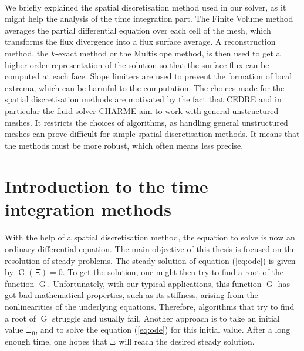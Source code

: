       \paragraph{}
      We briefly explained the spatial discretisation method used in our solver, as it might help the analysis of the time integration part.
      The Finite Volume method averages the partial differential equation over each cell of the mesh, which transforms the flux divergence into a flux surface average.
      A reconstruction method, the $k$-exact method or the Multislope method, is then used to get a higher-order representation of the solution so that the surface flux can be computed at each face.
      Slope limiters are used to prevent the formation of local extrema, which can be harmful to the computation.
      The choices made for the spatial discretisation methods are motivated by the fact that CEDRE and in particular the fluid solver CHARME aim to work with general unstructured meshes.
      It restricts the choices of algorithms, as handling general unstructured meshes can prove difficult for simple spatial discretisation methods.
      It means that the methods must be more robust, which often means less precise.


  \section{Introduction to the time integration methods}

    \paragraph{}
    With the help of a spatial discretisation method, the equation to solve is now an ordinary differential equation.
    The main objective of this thesis is focused on the resolution of steady problems.
    The steady solution of equation (\ref{eq:ode}) is given by $\operatorname{G}\left(\Xi\right) = 0$.
    To get the solution, one might then try to find a root of the function $\operatorname{G}$.
    Unfortunately, with our typical applications, this function $\operatorname{G}$ has got bad mathematical properties, such as its stiffness, arising from the nonlinearities of the underlying equations.
    Therefore, algorithms that try to find a root of $\operatorname{G}$ struggle and usually fail.
    Another approach is to take an initial value $\Xi_0$, and to solve the equation (\ref{eq:ode}) for this initial value.
    After a long enough time, one hopes that $\Xi$ will reach the desired steady solution.

